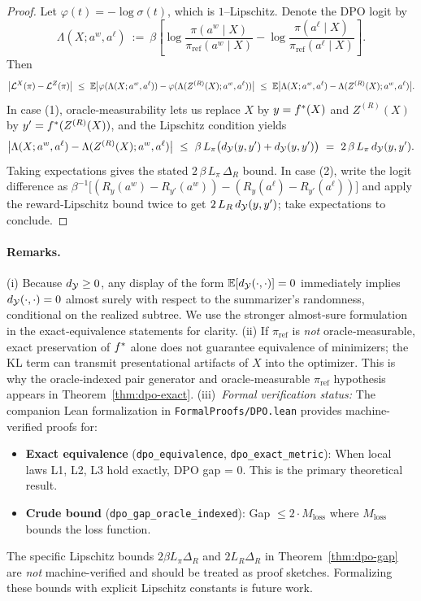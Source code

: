 \begin{proof}
Let $\varphi(t)=-\log\sigma(t)$, which is $1$–Lipschitz. Denote the DPO logit by
\[
\Lambda(X;a^w,a^\ell)\ :=\ \beta\!\left[\log\frac{\pi(a^w\mid X)}{\pi_{\mathrm{ref}}(a^w\mid X)}-\log\frac{\pi(a^\ell\mid X)}{\pi_{\mathrm{ref}}(a^\ell\mid X)}\right].
\]
Then
\[
\big|\mathcal L^{X}(\pi)-\mathcal L^{Z}(\pi)\big|
\ \le\ \E\big|\varphi(\Lambda(X;a^w,a^\ell))-\varphi(\Lambda(Z^{(R)}(X);a^w,a^\ell))\big|
\ \le\ \E\big|\Lambda(X;a^w,a^\ell)-\Lambda(Z^{(R)}(X);a^w,a^\ell)\big|.
\]
In case (1), oracle‑measurability lets us replace $X$ by $y=f^{\ast}(X)$ and $Z^{(R)}(X)$ by $y'=f^{\ast}(Z^{(R)}(X))$, and the Lipschitz condition yields
\[
\big|\Lambda(X;a^w,a^\ell)-\Lambda(Z^{(R)}(X);a^w,a^\ell)\big|\ \le\ \beta\,L_\pi\big(\metric(y,y')+\metric(y,y')\big)\ =\ 2\,\beta\,L_\pi\,\metric(y,y').
\]
Taking expectations gives the stated $2\,\beta\,L_\pi\,\Delta_R$ bound. In case (2), write the logit difference as $\beta^{-1}\!\big[(R_y(a^w)-R_{y'}(a^w))-(R_y(a^\ell)-R_{y'}(a^\ell))\big]$ and apply the reward‑Lipschitz bound twice to get $2\,L_R\,d_{\mathcal{Y}}(y,y')$; take expectations to conclude.
\end{proof}

\paragraph{Remarks.} (i) Because $d_{\mathcal{Y}}\ge0$, any display of the form $\mathbb{E}[d_{\mathcal{Y}}(\cdot,\cdot)]=0$ immediately implies $d_{\mathcal{Y}}(\cdot,\cdot)=0$ almost surely with respect to the summarizer's randomness, conditional on the realized subtree. We use the stronger almost‑sure formulation in the exact‐equivalence statements for clarity. (ii) If $\pi_{\mathrm{ref}}$ is \emph{not} oracle‑measurable, exact preservation of $f^{\ast}$ alone does not guarantee equivalence of minimizers; the KL term can transmit presentational artifacts of $X$ into the optimizer. This is why the oracle‑indexed pair generator and oracle‑measurable $\pi_{\mathrm{ref}}$ hypothesis appears in Theorem~\ref{thm:dpo-exact}. (iii)~\emph{Formal verification status:} The companion Lean formalization in \texttt{FormalProofs/DPO.lean} provides machine-verified proofs for:
\begin{itemize}
  \item \textbf{Exact equivalence} (\texttt{dpo\_equivalence}, \texttt{dpo\_exact\_metric}): When local laws L1, L2, L3 hold exactly, DPO gap = 0. This is the primary theoretical result.
  \item \textbf{Crude bound} (\texttt{dpo\_gap\_oracle\_indexed}): Gap $\le 2\cdot M_{\mathrm{loss}}$ where $M_{\mathrm{loss}}$ bounds the loss function.
\end{itemize}
The specific Lipschitz bounds $2\beta L_\pi\Delta_R$ and $2L_R\Delta_R$ in Theorem~\ref{thm:dpo-gap} are \emph{not} machine-verified and should be treated as proof sketches. Formalizing these bounds with explicit Lipschitz constants is future work.
